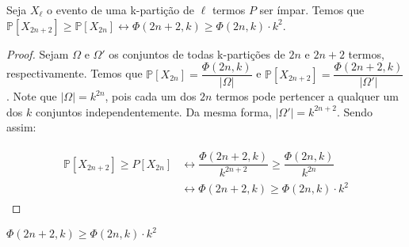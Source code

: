 \documentclass[12pt]{article}
\begin{document}
   \begin{lema}  
  	\label{lema6} 
  	Seja $X_\ell$ o evento de uma k-partição de $\ell$ termos $P$ ser ímpar. Temos que $\mathds{P}[X_{2n+2}] \geq \mathds{P}[X_{2n}] \longleftrightarrow \Phi(2n+2, k) \geq \Phi(2n, k) \cdot k^{2}$.
  \end{lema}
  
  \begin{proof}
  	Sejam $\Omega$ e $\Omega'$ os conjuntos de todas k-partições de $2n$ e $2n+2$ termos, respectivamente. Temos que $\mathds{P}[X_{2n}] = \dfrac{\Phi(2n, k)}{|\Omega|}$ e $\mathds{P}[X_{2n+2}] = \dfrac{\Phi(2n+2, k)}{|\Omega'|}$. Note que $|\Omega| = k^{2n}$, pois cada um dos $2n$ termos pode pertencer a qualquer um dos $k$ conjuntos independentemente. Da mesma forma, $|\Omega'| = k^{2n + 2}$. Sendo assim:
  	
  	\begin{align}
  		\begin{split}
  			\mathds{P}[X_{2n+2}] \geq {P}[X_{2n}] &\longleftrightarrow  \dfrac{\Phi(2n+2, k)}{k^{2n + 2}} \geq \dfrac{\Phi(2n, k)}{k^{2n}}\\
  			&\longleftrightarrow \Phi(2n+2, k) \geq \Phi(2n, k) \cdot k^{2}
  		\end{split} 
  	\end{align}
  	
  \end{proof}\newl
 
  
  \begin{lema}
  	\label{lema7} 
  	$\Phi(2n+2, k) \geq \Phi(2n, k) \cdot k^{2}$
  \end{lema}
  
\end{document}
